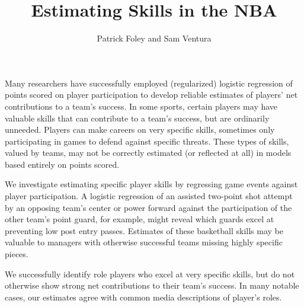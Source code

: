 \documentclass{article}
\author{Patrick Foley and Sam Ventura}
\title{Estimating Skills in the NBA}
\begin{document}
\maketitle{}

Many researchers have successfully employed (regularized) logistic regression of points scored on player participation to develop reliable estimates of players' net contributions to a team's success.  In some sports, certain players may have valuable skills that can contribute to a team's success, but are ordinarily unneeded.  Players can make careers on very specific skills, sometimes only participating in games to defend against specific threats.  These types of skills, valued by teams, may not be correctly estimated (or reflected at all) in models based entirely on points scored.

We investigate estimating specific player skills by regressing game events against player participation.  A logistic regression of an assisted two-point shot attempt by an opposing team's center or power forward against the participation of the other team's point guard, for example, might reveal which guards excel at preventing low post entry passes.  Estimates of these basketball skills may be valuable to managers with otherwise successful teams missing highly specific pieces.  

We successfully identify role players who excel at very specific skills, but do not otherwise show strong net contributions to their team's success.  In many notable cases, our estimates agree with common media descriptions of player's roles.  
\end{document}
